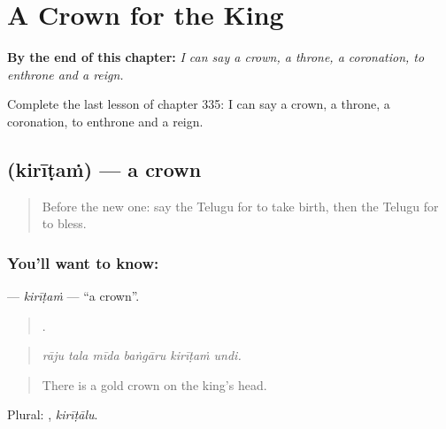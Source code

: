 
\chapter{A Crown for the King}
\label{ch:te-a-crown-for-the-king}

\begin{chapteropening}
\textbf{By the end of this chapter:} \emph{I can say a crown, a throne, a coronation, to enthrone and a reign.}

Complete the last lesson of chapter 335: I can say a crown, a throne, a coronation, to enthrone and a reign.
\end{chapteropening}

\section[\texorpdfstring{\te{కిరీటం} (kirīṭaṁ)}{కిరీటం (kirīṭaṁ)}]{ (kirīṭaṁ) — a crown}

\label{lesson:TE-C335-kiritam}



\begin{quote}
Before the new one: say the Telugu for to take birth, then the Telugu for to bless.
\end{quote}

\subsection*{You'll want to know: }
\textbf{} — \emph{kirīṭaṁ} — \textquotedblleft{}a crown\textquotedblright{}.

\begin{quote}
     .
\end{quote}

\begin{quote}
\emph{rāju tala mīda baṅgāru kirīṭaṁ undi.}
\end{quote}

\begin{quote}
There is a gold crown on the king's head.
\end{quote}

Plural: , \emph{kirīṭālu}.

